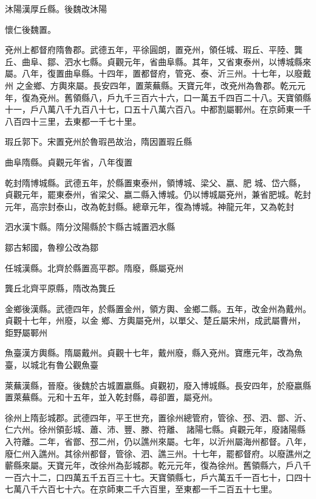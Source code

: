 \begin{pinyinscope}
 沐陽漢厚丘縣。後魏改沐陽



 懷仁後魏置。



 兗州上都督府隋魯郡。武德五年，平徐圓朗，置兗州，領任城、瑕丘、平陸、龔丘、曲阜、鄒、泗水七縣。貞觀元年，省曲阜縣。其年，又省東泰州，以博城縣來屬。八年，復置曲阜縣。十四年，置都督府，管兗、泰、沂三州。十七年，以廢戴州
 之金鄉、方輿來屬。長安四年，置萊蕪縣。天寶元年，改兗州為魯郡。乾元元年，復為兗州。舊領縣八，戶九千三百六十六，口一萬五千四百二十八。天寶領縣十一，戶八萬八千九百八十七，口五十八萬六百八。中都割屬鄆州。在京師東一千八百四十三里，去東都一千七十里。



 瑕丘郭下。宋置兗州於魯瑕邑故治，隋因置瑕丘縣



 曲阜隋縣。貞觀元年省，八年復置



 乾封隋博城縣。武德五年，於縣置東泰州，領博城、梁父、嬴、肥
 城、岱六縣，貞觀元年，罷東泰州，省梁父、嬴二縣入博城。仍以博城屬兗州，兼省肥城。乾封元年，高宗封泰山，改為乾封縣。總章元年，復為博城。神龍元年，又為乾封



 泗水漢卞縣。隋分汶陽縣於卞縣古城置泗水縣



 鄒古邾國，魯穆公改為鄒



 任城漢縣。北齊於縣置高平郡。隋廢，縣屬兗州



 龔丘北齊平原縣，隋改為龔丘



 金鄉後漢縣。武德四年，於縣置金州，領方輿、金鄉二縣。五年，改金州為戴州。貞觀十七年，州廢，以金
 鄉、方輿屬兗州，以單父、楚丘屬宋州，成武屬曹州，鉅野屬鄆州



 魚臺漢方輿縣。隋屬戴州。貞觀十七年，戴州廢，縣入兗州。寶應元年，改為魚臺，以城北有魯公觀魚臺



 萊蕪漢縣，晉廢。後魏於古城置嬴縣。貞觀初，廢入博城縣。長安四年，於廢嬴縣置萊蕪縣。元和十五年，並入乾封縣，尋卻置，屬兗州。



 徐州上隋彭城郡。武德四年，平王世充，置徐州總管府，管徐、邳、泗、鄫、沂、仁六州。徐州領彭城、蕭、沛、豐、滕、符離、
 諸陽七縣。貞觀元年，廢諸陽縣入符離。二年，省鄫、邳二州，仍以譙州來屬。七年，以沂州屬海州都督。八年，廢仁州入譙州。其徐州都督，管徐、泗、譙三州。十七年，罷都督府。以廢譙州之蘄縣來屬。天寶元年，改徐州為彭城郡。乾元元年，復為徐州。舊領縣六，戶八千一百六十二，口四萬五千五百三十七。天寶領縣七，戶六萬五千一百七十，口四十七萬八千六百七十六。在京師東二千六百里，至東都一千二百五十七里。




\end{pinyinscope}
